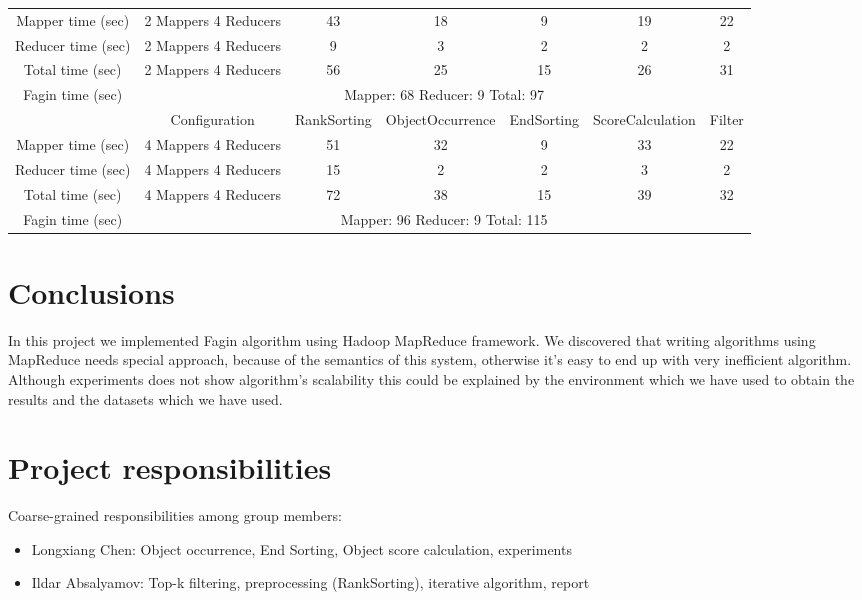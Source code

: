 \documentclass[a4paper]{article}
\begin{document}
\begin{table}[htbp]
{\begin{tabular}{|c|c|c|c|c|c|c|}
            \hline
            Mapper time (sec) & 2 Mappers 4 Reducers & 43 & 18 & 9 & 19 & 22  \\
            Reducer time (sec) & 2 Mappers 4 Reducers & 9 & 3 & 2 & 2 & 2   \\
            Total time (sec) & 2 Mappers 4 Reducers & 56 & 25 & 15 & 26 & 31 \\
            \hline
            Fagin time (sec) & \multicolumn{6}{|c|}{Mapper: 68 Reducer: 9 Total: 97}  \\
            \hline
            \hline
             & Configuration & RankSorting & ObjectOccurrence & EndSorting & ScoreCalculation & Filter  \\
            \hline
            Mapper time (sec) & 4 Mappers 4 Reducers & 51 & 32 & 9 & 33 & 22  \\
            Reducer time (sec) & 4 Mappers 4 Reducers & 15 & 2 & 2 & 3 & 2   \\
            Total time (sec) & 4 Mappers 4 Reducers & 72 & 38 & 15 & 39 & 32 \\
            \hline
            Fagin time (sec) & \multicolumn{6}{|c|}{Mapper: 96 Reducer: 9 Total: 115}  \\
            \hline
        \end{tabular}
    }
\end{table}

\section{Conclusions}

In this project we implemented Fagin algorithm using Hadoop MapReduce framework.
We discovered that writing algorithms using MapReduce needs special approach, because of the semantics of this system, otherwise it's easy to end up with very inefficient algorithm.
Although experiments does not show algorithm's scalability this could be explained by the environment which we have used to obtain the results and the datasets which we have used.

\section*{Project responsibilities}

Coarse-grained responsibilities among group members:
\begin{itemize}
    \item Longxiang Chen: Object occurrence, End Sorting, Object score calculation, experiments
    \item Ildar Absalyamov: Top-k filtering, preprocessing (RankSorting), iterative algorithm, report
\end{itemize}
\end{document}
